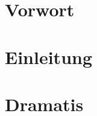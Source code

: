 \documentclass{scrbook}
\begin{document}
\begin{multicols}{2}
\section{Vorwort}
\lipsum[1]
\section{Einleitung}
\lipsum[2]

\columnbreak

\section{Dramatis}
\lipsum[3]
\end{multicols}
\end{document}
